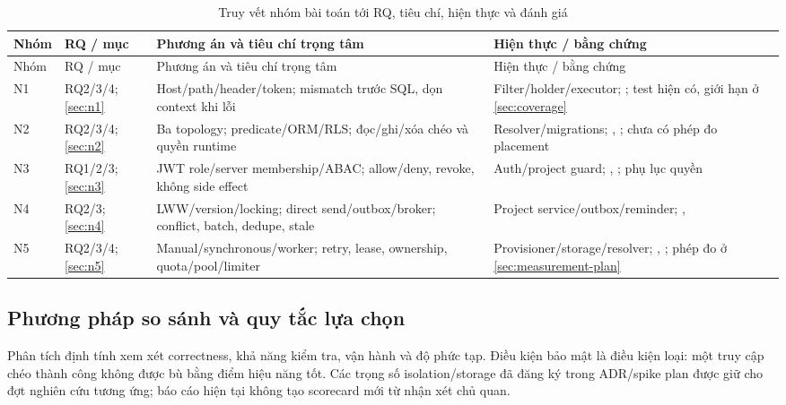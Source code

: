 \begin{longtable}{@{}P{.09\textwidth}P{.17\textwidth}P{.34\textwidth}P{.30\textwidth}@{}}
\caption{Truy vết nhóm bài toán tới RQ, tiêu chí, hiện thực và đánh giá}\label{tab:traceability}\\
\toprule Nhóm & RQ / mục & Phương án và tiêu chí trọng tâm & Hiện thực / bằng chứng \\
\midrule\endfirsthead
\toprule Nhóm & RQ / mục & Phương án và tiêu chí trọng tâm & Hiện thực / bằng chứng \\
\midrule\endhead
N1 & RQ2\slash 3\slash 4; \ref{sec:n1} & Host\slash path\slash header\slash token; mismatch trước SQL, dọn context khi lỗi & Filter\slash holder\slash executor; ; test hiện có, giới hạn ở \ref{sec:coverage} \\
N2 & RQ2\slash 3\slash 4; \ref{sec:n2} & Ba topology; predicate\slash ORM\slash RLS; đọc\slash ghi\slash xóa chéo và quyền runtime & Resolver\slash migrations; , ; chưa có phép đo placement \\
N3 & RQ1\slash 2\slash 3; \ref{sec:n3} & JWT role\slash server membership\slash ABAC; allow\slash deny, revoke, không side effect & Auth\slash project guard; , ; phụ lục quyền \\
N4 & RQ2\slash 3; \ref{sec:n4} & LWW\slash version\slash locking; direct send\slash outbox\slash broker; conflict, batch, dedupe, stale & Project service\slash outbox\slash reminder; ,  \\
N5 & RQ2\slash 3\slash 4; \ref{sec:n5} & Manual\slash synchronous\slash worker; retry, lease, ownership, quota\slash pool\slash limiter & Provisioner\slash storage\slash resolver; , ; phép đo ở \ref{sec:measurement-plan} \\
\bottomrule
\end{longtable}

\subsection{Phương pháp so sánh và quy tắc lựa chọn}
Phân tích định tính xem xét correctness, khả năng kiểm tra, vận hành và độ phức tạp. Điều kiện bảo mật là điều kiện loại: một truy cập chéo thành công không được bù bằng điểm hiệu năng tốt. Các trọng số isolation\slash storage đã đăng ký trong ADR\slash spike plan được giữ cho đợt nghiên cứu tương ứng; báo cáo hiện tại không tạo scorecard mới từ nhận xét chủ quan.


